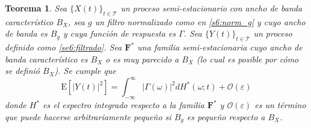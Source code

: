\documentclass[12pt,letterpaper]{book}
\newtheorem{teorema}{Teorema}[chapter]
\newcommand{\intR}{\int_{-\infty}^{\infty}}
\newcommand{\ef}{\mathbf{F}}
\newcommand{\efstar}{\ef^{\boldsymbol{*}}}
\newcommand{\E}[1]{\mathrm{E}\left[ #1 \right]}
\newcommand{\abso}[1]{\left| #1 \right|}
\newcommand{\xt}{$\{X(t)\}_{t\in \mathcal{T}}$ }
\newcommand{\orden}[1]{\mathcal{O}\left( #1 \right)}
\begin{document}
\begin{teorema}
\label{teo:aprox_orden}
Sea \xt un proceso semi-estacionario con ancho de banda característico $B_X$, sea $g$ un filtro normalizado como en \ref{s6:norm_g} y cuyo ancho de banda es $B_g$ y cuya función de respuesta es $\Gamma$. 
%
Sea $\{Y(t)\}_{t\in \mathcal{T}}$ un proceso definido como \ref{se6:filtrado}.
%
Sea $\efstar$ una familia semi-estacionaria cuyo ancho de banda característico es $B_X$ o es muy parecido a $B_X$ (lo cual es posible por cómo se definió $B_X$).
%
Se cumple que
\begin{equation}
\E{\abso{Y(t)}^{2}} = \intR \abso{\Gamma(\omega)}^{2} dH^{*}(\omega; t) + \orden{\varepsilon}
\end{equation}
donde $H^{*}$ es el espectro integrado respecto a la familia $\efstar$ y $\orden{\varepsilon}$ es un término que puede hacerse arbitrariamente pequeño si $B_g$ es pequeño respecto a $B_X$.
\end{teorema}
\end{document}
